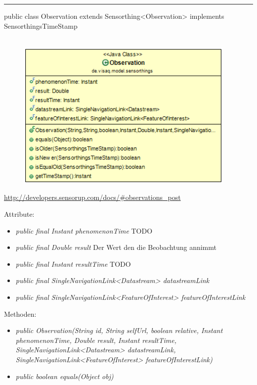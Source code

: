 \rule{\textwidth}{0.4pt}
public class Observation extends Sensorthing<Observation> implements SensorthingsTimeStamp
\\\\
\begin{minipage}{0.4\textwidth}
    \begin{figure}[H]
        {\centering\includegraphics[width=0.95\textwidth]{media/backend/modell/classes/Observation.png}}
    \end{figure}
    \end{minipage} \hfill
\begin{minipage}{0.6\textwidth}
    \url{http://developers.sensorup.com/docs/#observations_post}
\end{minipage}

Attribute:
\begin{itemize}
    \item \emph{public final Instant phenomenonTime} TODO %
    \item \emph{public final Double result} Der Wert den die Beobachtung annimmt
    \item \emph{public final Instant resultTime} TODO %
    \item \emph{public final SingleNavigationLink<Datastream> datastreamLink} 
    \item \emph{public final SingleNavigationLink<FeatureOfInterest> featureOfInterestLink} 
\end{itemize}
Methoden:
\begin{itemize}
    \item \emph{public Observation(String id, String selfUrl, boolean relative, Instant phenomenonTime, Double result, Instant resultTime, SingleNavigationLink<Datastream> datastreamLink, SingleNavigationLink<FeatureOfInterest> featureOfInterestLink)}
    \item \emph{public boolean equals(Object obj)} 
\end{itemize}

